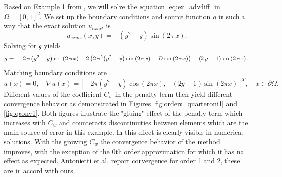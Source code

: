 \begin{example}
\label{ex:quart1}
Based on Example 1 from \cite{Antonietti2013},
we will solve the equation \eqref{eq:ex_advdiff} in $\Omega = [0, 1]^2$.
We set up the boundary conditions and source function $g$ in such a way that
the exact solution $u_{exact}$ is
\begin{equation}
	u_{exact}(x,y) =  -{\left(y^{2} - y\right)} \sin\left(2 \, \pi x\right).
\end{equation}
Solving for $g$ yields
\begin{equation}
	g = \\
	 -2 \, \pi {\left(y^{2} - y\right)} \cos\left(2 \, \pi x\right) - 2 \, {\left(2 \,
	 \pi^{2}
	{\left(y^{2} - y\right)} \sin\left(2 \, \pi x\right) - D\sin\left(2 \, \pi
	x\right)\right)}
	 - {\left(2 \, y - 1\right)} \sin\left(2 \, \pi x\right).
\end{equation}
Matching boundary conditions are
\begin{equation}
u(x) = 0, \quad \nabla u(x) = [-2\pi(y^2 - y)\cos(2 \pi x), -(2 y - 1)\sin(2\pi  x)]^T,
\quad x \in \partial\Omega.
\end{equation}
Different values of the coefficient $C_w$ in the penalty term then yield different
convergence behavior as demonstrated in Figures \ref{fig:orders_quarteroni1}
and \ref{fig:qconv1}. Both figures illustrate the "gluing" effect of the penalty term
which increases with $C_w$ and counteracts discontinuities between elements
which are the main source of error in this example. In  this effect
is clearly visible in numerical solutions. With the growing $C_w$ the convergence
behavior of the method improves, with the exception of the 0th order approximation for which it
has no effect as expected. Antonietti et al. \cite{Antonietti2013} report convergence for
order 1 and 2, these are in accord with ours.


\end{example}
